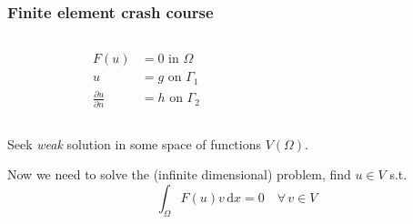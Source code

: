 \documentclass[presentation]{beamer}
\begin{document}
\begin{frame}
  \frametitle{Finite element crash course}
  \begin{columns}
    \begin{column}{0.5\textwidth}
      \begin{align*}
        F(u) &= 0 \text{ in $\Omega$}\\
        u &= g \text{ on $\Gamma_1$}\\
        \frac{\partial u}{\partial n} &= h \text{ on $\Gamma_2$}
      \end{align*}
    \end{column}
    \begin{column}{0.5\textwidth}
    \end{column}
  \end{columns}

  Seek \emph{weak} solution in some space of functions $V(\Omega)$.

  Now we need to solve the (infinite dimensional) problem, find $u\in V$ s.t.
  \begin{equation*}
    \int_\Omega \!F(u) v\, \text{d}x = 0 \quad \forall\, v \in V
  \end{equation*}
\end{frame}
\end{document}
